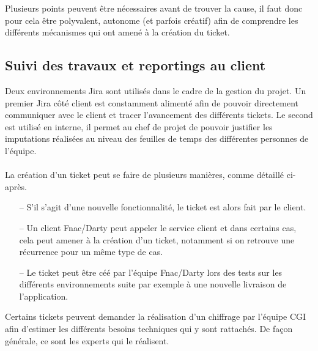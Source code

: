 \documentclass[12pt, a4paper]{report}
\begin{document}
	\noindent
	Plusieurs points peuvent être nécessaires avant de trouver la cause, il faut donc pour cela être polyvalent, autonome (et parfois créatif) afin de comprendre les différents mécanismes qui ont amené à la création du ticket.

	\subsection{Suivi des travaux et reportings au client}

	Deux environnements Jira sont utilisés dans le cadre de la gestion du projet. Un premier Jira côté client est constamment alimenté afin de pouvoir directement communiquer avec le client et tracer l'avancement des différents tickets. Le second est utilisé en interne, il permet au chef de projet de pouvoir justifier les imputations réalisées au niveau des feuilles de temps des différentes personnes de l'équipe.
	\\\\
	La création d'un ticket peut se faire de plusieurs manières, comme détaillé ci-après.
	\\
	\begin{itemize}
		\item[–] S'il s'agit d'une nouvelle fonctionnalité, le ticket est alors fait par le client.
		\item[–] Un client Fnac/Darty peut appeler le service client et dans certains cas, cela peut amener à la création d'un ticket, notamment si on retrouve une récurrence pour un même type de cas.
		\item[–] Le ticket peut être céé par l'équipe Fnac/Darty lors des tests sur les différents environnements suite par exemple à une nouvelle livraison de l'application.\\
	\end{itemize}

	\noindent
	Certains tickets peuvent demander la réalisation d'un chiffrage par l'équipe CGI afin d'estimer les différents besoins techniques qui y sont rattachés. De façon générale, ce sont les experts qui le réalisent.
\end{document}
